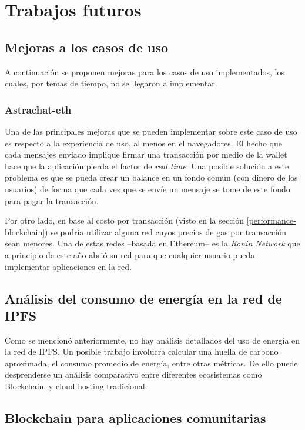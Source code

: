 \section{Trabajos futuros}

\subsection{Mejoras a los casos de uso}

A continuación se proponen mejoras para los casos de uso implementados, los cuales, por temas de tiempo, no se llegaron a implementar.

\subsubsection{Astrachat-eth}

Una de las principales mejoras que se pueden implementar sobre este caso de uso es respecto a la experiencia de uso, al menos en el navegadores. El hecho que cada mensajes enviado implique firmar una transacción por medio de la wallet hace que la aplicación pierda el factor de \textit{real time}. Una posible solución a este problema es que se pueda crear un balance en un fondo común (con dinero de los usuarios) de forma que cada vez que se envíe un mensaje se tome de este fondo para pagar la transacción. %

Por otro lado, en base al costo por transacción (visto en la sección \ref{performance-blockchain}) se podría utilizar alguna red cuyos precios de gas por transacción sean menores. Una de estas redes --basada en Ethereum-- es la \textit{Ronin Network}\cite{ronin-network}\cite{ronin-network-whitepaper} que a principio de este año abrió su red para que cualquier usuario pueda implementar aplicaciones en la red.

\subsection{Análisis del consumo de energía en la red de IPFS}

Como se mencionó anteriormente, no hay análisis detallados del uso de energía en la red de IPFS. Un posible trabajo involucra calcular una huella de carbono aproximada, el consumo promedio de energía, entre otras métricas. De ello puede desprenderse un análisis comparativo entre diferentes ecosistemas como Blockchain, y cloud hosting tradicional.

\subsection{Blockchain para aplicaciones comunitarias}

